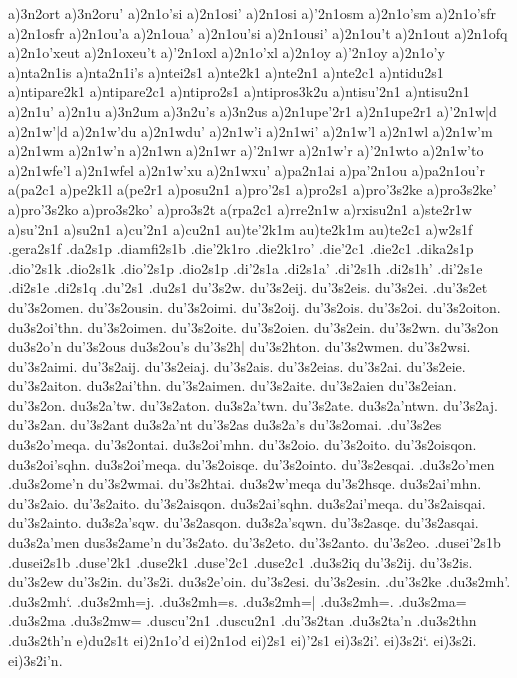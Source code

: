 {a)3n2ort
a)3n2oru'
a)2n1o'si
a)2n1osi'
a)2n1osi
a)'2n1osm
a)2n1o'sm
a)2n1o'sfr
a)2n1osfr
a)2n1ou'a
a)2n1oua'
a)2n1ou'si
a)2n1ousi'
a)2n1ou't
a)2n1out
a)2n1ofq
a)2n1o'xeut
a)2n1oxeu't
a)'2n1oxl
a)2n1o'xl
a)2n1oy
a)'2n1oy
a)2n1o'y
a)nta2n1is
a)nta2n1i's
a)ntei2s1
a)nte2k1
a)nte2n1
a)nte2c1
a)ntidu2s1
a)ntipare2k1
a)ntipare2c1
a)ntipro2s1
a)ntipros3k2u
a)ntisu'2n1
a)ntisu2n1
a)2n1u'
a)2n1u
a)3n2um
a)3n2u's
a)3n2us
a)2n1upe'2r1
a)2n1upe2r1
a)'2n1w|d
a)2n1w'|d
a)2n1w'du
a)2n1wdu'
a)2n1w'i
a)2n1wi'
a)2n1w'l
a)2n1wl
a)2n1w'm
a)2n1wm
a)2n1w'n
a)2n1wn
a)2n1wr
a)'2n1wr
a)2n1w'r
a)'2n1wto
a)2n1w'to
a)2n1wfe'l
a)2n1wfel
a)2n1w'xu
a)2n1wxu'
a)pa2n1ai
a)pa'2n1ou
a)pa2n1ou'r
a(pa2c1
a)pe2k1l
a(pe2r1
a)posu2n1
a)pro'2s1
a)pro2s1
a)pro'3s2ke
a)pro3s2ke'
a)pro'3s2ko
a)pro3s2ko'
a)pro3s2t
a(rpa2c1
a)rre2n1w
a)rxisu2n1
a)ste2r1w
a)su'2n1
a)su2n1
a)cu'2n1
a)cu2n1
au)te'2k1m
au)te2k1m
au)te2c1
a)w2s1f
.gera2s1f
.da2s1p
.diamfi2s1b
.die'2k1ro
.die2k1ro'
.die'2c1
.die2c1
.dika2s1p
.dio'2s1k
.dio2s1k
.dio'2s1p
.dio2s1p
.di'2s1a
.di2s1a'
.di'2s1h
.di2s1h'
.di'2s1e
.di2s1e
.di2s1q
.du'2s1
.du2s1
%
du'3s2w.
du'3s2eij.
du'3s2eis.
du'3s2ei.
.du'3s2et
du'3s2omen.
du'3s2ousin.
du'3s2oimi.
du'3s2oij.
du'3s2ois.
du'3s2oi.
du'3s2oiton.
du3s2oi'thn.
du'3s2oimen.
du'3s2oite.
du'3s2oien.
du'3s2ein.
du'3s2wn.
du'3s2on
du3s2o'n
du'3s2ous
du3s2ou's
du'3s2h|
du'3s2hton.
du'3s2wmen.
du'3s2wsi.
du'3s2aimi.
du'3s2aij.
du'3s2eiaj.
du'3s2ais.
du'3s2eias.
du'3s2ai.
du'3s2eie.
du'3s2aiton.
du3s2ai'thn.
du'3s2aimen.
du'3s2aite.
du'3s2aien
du'3s2eian.
du'3s2on.
du3s2a'tw.
du'3s2aton.
du3s2a'twn.
du'3s2ate.
du3s2a'ntwn.
du'3s2aj.
du'3s2an.
du'3s2ant
du3s2a'nt
du'3s2as
du3s2a's
du'3s2omai.
.du'3s2es
du3s2o'meqa.
du'3s2ontai.
du3s2oi'mhn.
du'3s2oio.
du'3s2oito.
du'3s2oisqon.
du3s2oi'sqhn.
du3s2oi'meqa.
du'3s2oisqe.
du'3s2ointo.
du'3s2esqai.
.du3s2o'men
.du3s2ome'n
du'3s2wmai.
du'3s2htai.
du3s2w'meqa
du'3s2hsqe.
du3s2ai'mhn.
du'3s2aio.
du'3s2aito.
du'3s2aisqon.
du3s2ai'sqhn.
du3s2ai'meqa.
du'3s2aisqai.
du'3s2ainto.
du3s2a'sqw.
du'3s2asqon.
du3s2a'sqwn.
du'3s2asqe.
du'3s2asqai.
du3s2a'men
dus3s2ame'n
du'3s2ato.
du'3s2eto.
du'3s2anto.
du'3s2eo.
.dusei'2s1b
.dusei2s1b
.duse'2k1
.duse2k1
.duse'2c1
.duse2c1
.du3s2iq
du'3s2ij.
du'3s2is.
du'3s2ew
du'3s2in.
du'3s2i.
du3s2e'oin.
du'3s2esi.
du'3s2esin.
.du'3s2ke
.du3s2mh'.
.du3s2mh`.
.du3s2mh=j.
.du3s2mh=s.
.du3s2mh=|
.du3s2mh=.
.du3s2ma=
.du3s2ma
.du3s2mw=
.duscu'2n1
.duscu2n1
.du'3s2tan
.du3s2ta'n
.du3s2thn
.du3s2th'n
e)du2s1t
ei)2n1o'd
ei)2n1od
ei)2s1
ei)'2s1
ei)3s2i'.
ei)3s2i`.
ei)3s2i.
ei)3s2i'n.
}
